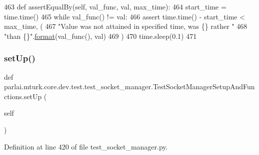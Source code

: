 \begin{DoxyCode}
463     \textcolor{keyword}{def }assertEqualBy(self, val\_func, val, max\_time):
464         start\_time = time.time()
465         \textcolor{keywordflow}{while} val\_func() != val:
466             \textcolor{keyword}{assert} time.time() - start\_time < max\_time, (
467                 \textcolor{stringliteral}{"Value was not attained in specified time, was \{\} rather "}
468                 \textcolor{stringliteral}{"than \{\}"}.\hyperlink{namespaceparlai_1_1chat__service_1_1services_1_1messenger_1_1shared__utils_a32e2e2022b824fbaf80c747160b52a76}{format}(val\_func(), val)
469             )
470             time.sleep(0.1)
471 
\end{DoxyCode}
\mbox{\label{classparlai_1_1mturk_1_1core_1_1dev_1_1test_1_1test__socket__manager_1_1TestSocketManagerSetupAndFunctions_a8d0f8ea9d4c7bc39a42474b329bdf4d7}} 
\subsubsection{\texorpdfstring{set\+Up()}{setUp()}}
{\footnotesize\ttfamily def parlai.\+mturk.\+core.\+dev.\+test.\+test\+\_\+socket\+\_\+manager.\+Test\+Socket\+Manager\+Setup\+And\+Functions.\+set\+Up (\begin{DoxyParamCaption}\item[{}]{self }\end{DoxyParamCaption})}



Definition at line 420 of file test\+\_\+socket\+\_\+manager.\+py.


